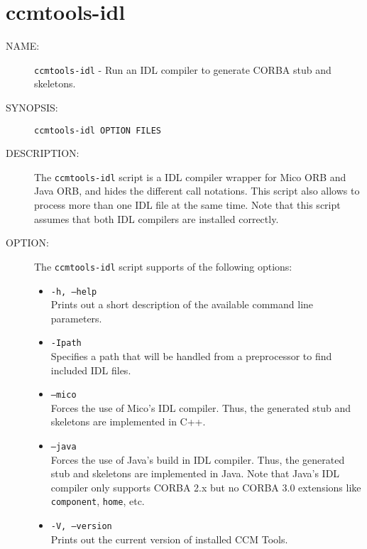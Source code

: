 \section{ccmtools-idl}

\begin{description}

\item [NAME:] 
  {\tt ccmtools-idl} - Run an IDL compiler to generate CORBA stub and skeletons.

\item [SYNOPSIS:] 
  {\tt ccmtools-idl OPTION FILES}

\item [DESCRIPTION:]
  The {\tt ccmtools-idl} script is a IDL compiler wrapper for Mico ORB and Java ORB,
  and hides the different call notations. This script also allows to process more than
  one IDL file at the same time. 
  Note that this script assumes that both IDL compilers are installed correctly.

\item [OPTION:]
  The {\tt ccmtools-idl} script supports of the following options:
  \begin{itemize}
  \item {\tt -h, --help} \\
    Prints out a short description of the available command line parameters.

  \item {\tt -Ipath} \\
    Specifies a path that will be handled from a preprocessor to find 
    included IDL files.
   
  \item {\tt --mico} \\
    Forces the use of Mico's IDL compiler.
    Thus, the generated stub and skeletons are implemented in C++.

  \item {\tt --java} \\
    Forces the use of Java's build in IDL compiler.
    Thus, the generated stub and skeletons are implemented in Java.
    Note that Java's IDL compiler only supports CORBA 2.x but no CORBA 3.0 extensions
    like {\tt component}, {\tt home}, etc.

  \item {\tt -V, --version} \\
    Prints out the current version of installed CCM Tools.
  \end{itemize}
  

\end{description}
